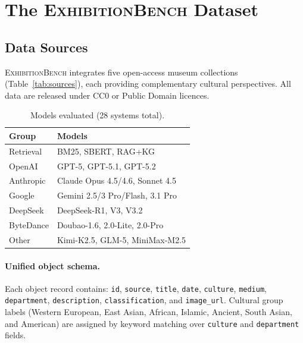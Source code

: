 \documentclass[11pt]{article}
\newcommand{\bench}{\textsc{ExhibitionBench}}
\begin{document}
\section{The \bench{} Dataset}
\label{sec:dataset}

\subsection{Data Sources}
\label{sec:sources}

\bench{} integrates five open-access museum collections (Table~\ref{tab:sources}),
each providing complementary cultural perspectives.
All data are released under CC0 or Public Domain licences.

\begin{table}[!t]
\centering\small
\setlength{\tabcolsep}{4pt}
\begin{tabular}{@{}ll@{}}
\toprule
\textbf{Group} & \textbf{Models} \\
\midrule
Retrieval & BM25, SBERT, RAG+KG \\
OpenAI & GPT-5, GPT-5.1, GPT-5.2 \\
Anthropic & Claude Opus 4.5/4.6, Sonnet 4.5 \\
Google & Gemini 2.5/3 Pro/Flash, 3.1 Pro \\
DeepSeek & DeepSeek-R1, V3, V3.2 \\
ByteDance & Doubao-1.6, 2.0-Lite, 2.0-Pro \\
Other & Kimi-K2.5, GLM-5, MiniMax-M2.5 \\
\bottomrule
\end{tabular}
\caption{Models evaluated (28 systems total).}
\label{tab:models}
\end{table}


\paragraph{Unified object schema.}
Each object record contains: \texttt{id}, \texttt{source},
\texttt{title}, \texttt{date}, \texttt{culture}, \texttt{medium},
\texttt{department}, \texttt{description}, \texttt{classification},
and \texttt{image\_url}.
Cultural group labels (Western European, East Asian, African,
Islamic, Ancient, South Asian, and American) are assigned by keyword
matching over \texttt{culture} and \texttt{department} fields.
\end{document}

